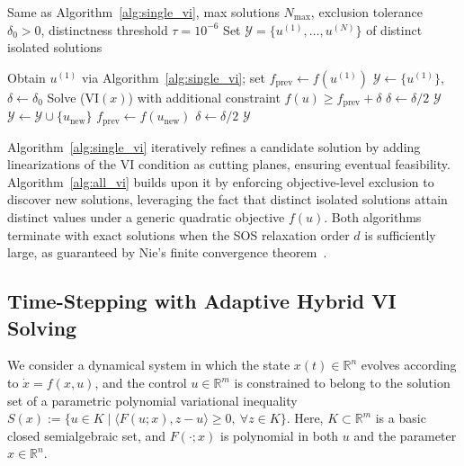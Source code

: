 \documentclass[sn-basic,Numbered]{sn-jnl}
\theoremstyle{thmstyleone}%
\begin{document}
\begin{algorithm}[htbp]
\caption{Enumerate All Isolated Solutions of ($\mathrm{VI}(x)$)}
\label{alg:all_vi}
\begin{algorithmic}[1]
\Require Same as Algorithm~\ref{alg:single_vi}, max solutions $N_{\max}$, exclusion tolerance $\delta_0 > 0$, distinctness threshold $\tau = 10^{-6}$
\Ensure Set $\mathcal{Y} = \{ u^{(1)}, \dots, u^{(N)} \}$ of distinct isolated solutions

\State Obtain $u^{(1)}$ via Algorithm~\ref{alg:single_vi}; set $f_{\text{prev}} \gets f(u^{(1)})$
\State $\mathcal{Y} \gets \{ u^{(1)} \}$, $\delta \gets \delta_0$
    \Repeat
        \State Solve ($\mathrm{VI}(x)$) with additional constraint $f(u) \geq f_{\text{prev}} + \delta$
            \State $\delta \gets \delta / 2$
        \EndIf
        \State \Return $\mathcal{Y}$
    \EndIf
        \State $\mathcal{Y} \gets \mathcal{Y} \cup \{ u_{\text{new}} \}$
        \State $f_{\text{prev}} \gets f(u_{\text{new}})$
    \Else
        \State $\delta \gets \delta / 2$ 
    \EndIf
\EndFor
\State \Return $\mathcal{Y}$
\end{algorithmic}
\end{algorithm}

Algorithm~\ref{alg:single_vi} iteratively refines a candidate solution by adding linearizations of the VI condition as cutting planes, ensuring eventual feasibility. Algorithm~\ref{alg:all_vi} builds upon it by enforcing objective-level exclusion to discover new solutions, leveraging the fact that distinct isolated solutions attain distinct values under a generic quadratic objective $f(u)$. Both algorithms terminate with exact solutions when the SOS relaxation order $d$ is sufficiently large, as guaranteed by Nie’s finite convergence theorem~\cite[Thm.~3.3]{nie2013finite}.

\subsection{Time-Stepping with Adaptive Hybrid VI Solving}

We consider a dynamical system in which the state $x(t) \in \mathbb{R}^n$ evolves according to $\dot{x} = f(x, u)$, and the control $u \in \mathbb{R}^m$ is constrained to belong to the solution set of a parametric polynomial variational inequality 
$S(x) := \{ u \in K \mid \langle F(u; x), z - u \rangle \geq 0,\ \forall z \in K \}$.
Here, $K \subset \mathbb{R}^m$ is a basic closed semialgebraic set, and $F(\cdot; x)$ is polynomial in both $u$ and the parameter $x \in \mathbb{R}^n$.
\end{document}
